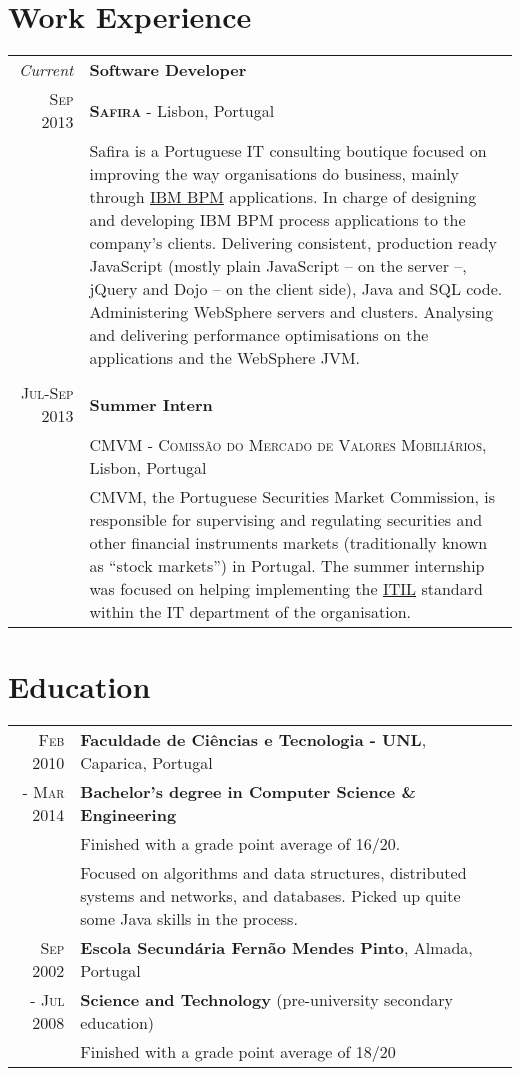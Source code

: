 \documentclass[a4paper,10pt]{article}
\begin{document}
\section{Work Experience}
\begin{tabular}{r|p{11.5cm}}
 \emph{Current} & \textbf{Software Developer}\\
 \textsc{Sep 2013} & \textbf{\textsc{Safira}} - Lisbon, Portugal \\
 & \footnotesize{Safira is a Portuguese IT consulting boutique focused on improving the way organisations do business, mainly through \href{http://www-03.ibm.com/software/products/en/business-process-manager-family}{IBM BPM} applications. In charge of designing and developing IBM BPM process applications to the company's clients. Delivering consistent, production ready JavaScript (mostly plain JavaScript -- on the server --, jQuery and Dojo -- on the client side), Java and SQL code. Administering WebSphere servers and clusters. Analysing and delivering performance optimisations on the applications and the WebSphere JVM.}\\\multicolumn{2}{c}{} \\
 \textsc{Jul-Sep 2013} & \textbf{Summer Intern} \\
 & \textsc{CMVM - Comissão do Mercado de Valores Mobiliários}, Lisbon, Portugal \\
&\footnotesize{CMVM, the Portuguese Securities Market Commission, is responsible for supervising and regulating securities and other financial instruments markets (traditionally known as ``stock markets'') in Portugal. The summer internship was focused on helping implementing the \href{http://www.itil-officialsite.com/}{ITIL} standard within the IT department of the organisation.}
\end{tabular}

\section{Education}
\begin{tabular}{rp{11cm}r}
\textsc{Feb} 2010 & \textbf{Faculdade de Ciências e Tecnologia - UNL}, Caparica, Portugal\\
- \textsc{Mar} 2014 & \small \textbf{Bachelor's degree in Computer Science \& Engineering}\\
& \small Finished with a grade point average of 16/20.\\
& \footnotesize{Focused on algorithms and data structures, distributed systems and networks, and databases. Picked up quite some Java skills in the process.}\\
\textsc{Sep} 2002 & \textbf{Escola Secundária Fernão Mendes Pinto}, Almada, Portugal\\
- \textsc{Jul} 2008 & \small \textbf{Science and Technology} (pre-university secondary education)\\
& \small Finished with a grade point average of 18/20\\
\end{tabular}
\end{document}
